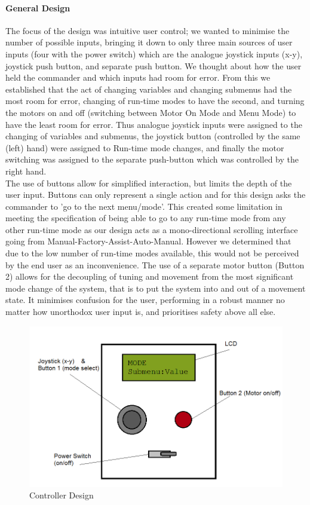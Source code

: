 \documentclass{article}
\begin{document}
	\paragraph{General Design}
	The focus of the design was intuitive user control; we wanted to minimise the number of possible inputs, bringing it down to only three main sources of user inputs (four with the power switch) which are the analogue joystick inputs (x-y), joystick push button, and separate push button. We thought about how the user held the commander and which inputs had room for error. From this we established that the act of changing variables and changing submenus had the most room for error, changing of run-time modes to have the second, and turning the motors on and off (switching between Motor On Mode and Menu Mode) to have the least room for error. Thus analogue joystick inputs were assigned to the changing of variables and submenus, the joystick button (controlled by the same (left) hand) were assigned to Run-time mode changes, and finally the motor switching was assigned to the separate push-button which was controlled by the right hand.\\
	
	The use of buttons allow for simplified interaction, but limits the depth of the user input. Buttons can only represent a single action and for this design asks the commander to 'go to the next menu/mode'. This created some limitation in meeting the specification of being able to go to any run-time mode from any other run-time mode as our design acts as a mono-directional scrolling interface going from Manual-Factory-Assist-Auto-Manual. However we determined that due to the low number of run-time modes available, this would not be perceived by the end user as an inconvenience. The use of a separate motor button (Button 2) allows for the decoupling of tuning and movement from the most significant mode change of the system, that is to put the system into and out of a movement state. It minimises confusion for the user, performing in a robust manner no matter how unorthodox user input is, and prioritises safety above all else.
	
	\begin{figure}[h]
	\includegraphics[scale=0.45]{ControllerDesign.png}
	\centering
	\caption{Controller Design}
	\end{figure}
	
\end{document}
